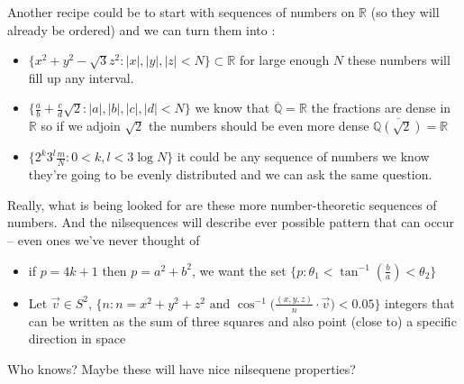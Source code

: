 \documentclass[12pt]{article}
\begin{document}
Another recipe could be to start with sequences of numbers on $\mathbb{R}$ (so they will already be ordered) and we can turn them into :
\begin{itemize}
\item $ \{ x^2 + y^2 - \sqrt{3} z^2 : |x|, |y|, |z| < N \}\subset \mathbb{R} $ for large enough $N$ these numbers will fill up any interval. 
\item $ \{ \frac{a}{b} + \frac{c}{d} \sqrt{2} : |a|, |b|, |c|, |d| < N \}$  we know that $\overline{\mathbb{Q}}= \mathbb{R}$ the fractions are dense in $\mathbb{R}$ so if we adjoin $\sqrt{2}$ the numbers should be even more dense $ \overline{\mathbb{Q}(\sqrt{2})}= \mathbb{R}$
\item $ \{ 2^k 3^l \frac{m}{N}: 0 < k, l < 3 \log N \} $  it could be any sequence of numbers we know they're going to be evenly distributed and we can ask the same question.
\end{itemize}
Really, what is being looked for are these more number-theoretic sequences of numbers. And the nilsequences will describe ever possible pattern that can occur -- even ones we've never thought of
\begin{itemize}
\item if $p = 4k+1$ then $p = a^2 + b^2$, we want the set $\big\{  p : \theta_1 < \tan^{-1}(\frac{b}{a}) < \theta_2\big\}$
\item Let $\vec{v} \in S^2$,  $ \big\{ n : n = x^2 + y^2 + z^2 \text{ and } \cos^{-1}\big( \frac{(x,y,z)}{n}  \cdot \vec{v} \big) < 0.05 \big\}$ integers that can be written as the sum of three squares and also point (close to) a specific direction in space
\end{itemize}
Who knows?  Maybe these will have nice nilsequene properties?
 
\newpage
\end{document}
